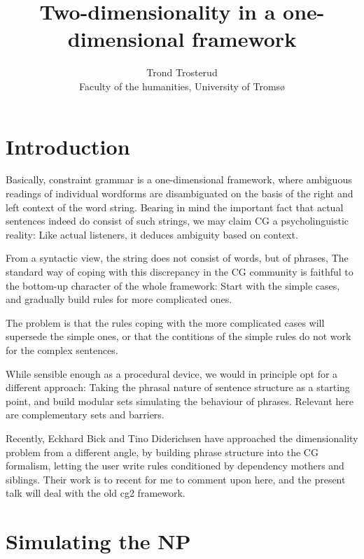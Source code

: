   \documentclass[a4paper,english]{article}
\begin{document}
\title{Two-dimensionality in a one-dimensional framework}

\author{Trond Trosterud\\ 
Faculty of the humanities,  University of Tromsø}


\maketitle


\section{Introduction}

Basically, constraint grammar is a one-dimensional framework, where ambiguous readings of individual wordforms are disambiguated on the basis of the right and left context of the word string. Bearing in mind the important fact that actual sentences indeed do consist of such strings, we may claim CG a psycholinguistic reality: Like actual listeners, it deduces ambiguity based on context.%

From a syntactic view, the string does not consist of words, but of phrases, The standard way of coping with this discrepancy in the CG community is faithful to the bottom-up character of the whole framework: Start with the simple cases, and gradually build rules for more complicated ones.%

The problem is that the rules coping with the more complicated cases will supersede the simple ones, or that the contitions of the simple rules do not work for the complex sentences.%

While sensible enough as a procedural device, we would in principle opt for a different approach: Taking the phrasal nature of sentence structure as a starting point, and build modular sets simulating the behaviour of phrases. Relevant here are complementary sets and barriers.%

Recently, Eckhard Bick and Tino Diderichsen have approached the dimensionality problem from a different angle, by building phrase structure into the CG formalism, letting the user write rules conditioned by dependency mothers and siblings. Their work is to recent for me to comment upon here, and the present talk will deal with the old cg2 framework.%

\section{Simulating the NP}
\end{document}
